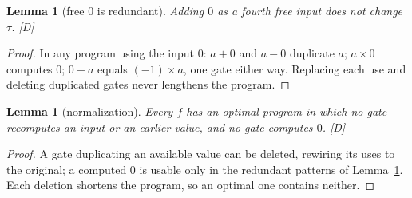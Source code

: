 \documentclass[11pt]{article}
\newtheorem{lemma}[theorem]{Lemma}
\theoremstyle{definition}
\theoremstyle{remark}
\begin{document}
\begin{lemma}[free $0$ is redundant]\label{lem:zero}
Adding $0$ as a fourth free input does not change $\tau$. \emph{[D]}
\end{lemma}
\begin{proof}
In any program using the input $0$: $a + 0$ and $a - 0$ duplicate $a$; $a \times 0$
computes $0$; $0 - a$ equals $(-1) \times a$, one gate either way. Replacing each use
and deleting duplicated gates never lengthens the program.
\end{proof}

\begin{lemma}[normalization]\label{lem:norm}
Every $f$ has an optimal program in which no gate recomputes an input or an earlier
value, and no gate computes $0$. \emph{[D]}
\end{lemma}
\begin{proof}
A gate duplicating an available value can be deleted, rewiring its uses to the
original; a computed $0$ is usable only in the redundant patterns of
Lemma~\ref{lem:zero}. Each deletion shortens the program, so an optimal one contains
neither.
\end{proof}
\end{document}
